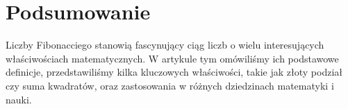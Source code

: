 \documentclass[12pt]{article}
\begin{document}
\section{Podsumowanie}
Liczby Fibonacciego stanowią fascynujący ciąg liczb o wielu interesujących właściwościach matematycznych. W artykule tym omówiliśmy ich podstawowe definicje, przedstawiliśmy kilka kluczowych właściwości, takie jak złoty podział czy suma kwadratów, oraz zastosowania w różnych dziedzinach matematyki i nauki.
\end{document}
